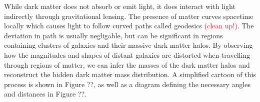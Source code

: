 \documentclass[%
 reprint,
 amsmath,amssymb,
 aps,nofootinbib
]{revtex4-1}
\begin{document}

While dark matter does not absorb or emit light, it does interact with light indirectly through gravitational lensing. The presence of matter curves spacetime locally which causes light to follow curved paths called geodesics \textcolor{red}{(clean up!)}. The deviation in path is usually negligable, but can be significant in regions containing clusters of galaxies and their massive dark matter halos. By observing how the magnitudes and shapes of distant galaxies are distorted when travelling through regions of matter, we can infer the masses of the dark matter halos and reconstruct the hidden dark matter mass distribution. A simplified cartoon of this process is shown in Figure ??, as well as a diagram defining the necessary angles and distances in Figure ??.
\end{document}
